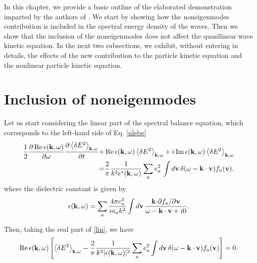 \documentclass[12pt,a4paper,ruledheader]{report}
\begin{document}
In this chapter, we provide a basic outline of the elaborated demonstration
imparted by the authors of \cite{YZKS16}. We start by showing how the
noneigenmodes contribution is included in the spectral energy density of the
waves. Then we show that the inclusion of the noneigenmodes does not affect
the quasilinear wave kinetic equation. In the next two subsections, we
exhibit, without entering in details, the effects of the new contribution
to the particle kinetic equation and the nonlinear particle kinetic equation.



\section{Inclusion of noneigenmodes}
\label{sec:inc-non}
Let us start considering the linear part of the spectral balance equation,
which corresponds to the left-hand side of Eq. \eqref{nlebe}
\begin{equation}
  \label{lin}
  \begin{split}
  \frac{1}{2}\frac{\partial \,\mbox{Re}\,\epsilon({\bf k},\omega)}{\partial \omega}
  \frac{\partial \left< \delta E^2 \right>_{{\bf k},\omega}}{\partial t}
  +&\,\mbox{Re}\,\epsilon({\bf k},\omega)
  \left< \delta E^2 \right>_{{\bf k},\omega}
  +i\, \mbox{Im}\,\epsilon({\bf k},\omega)
  \left< \delta E^2 \right>_{{\bf k},\omega}\\
  =&\frac{2}{\pi}\frac{1}{k^2\epsilon^{*}({\bf k},\omega)}
  \sum_a e^2_a\, \int d{\bf v}\,\delta(\omega-{\bf k \cdot v})f_a({\bf v}),
\end{split}
\end{equation}
where the dielectric constant is given by
\begin{equation}
  \label{dielec}
  \epsilon({\bf k},\omega)=\sum_a \frac{4\pi e^2_a}{m_ak^2}\int d{\bf v}\,
  \frac{{\bf k \cdot}\partial f_a/\partial{\bf v}}{\omega-{\bf k \cdot v}+i0}.
\end{equation}

Then, taking the real part of \eqref{lin}, we have
\begin{equation}
  \label{real}
  \mbox{Re}\, \epsilon({\bf k},\omega)\left[
  \left\langle \delta E^2 \right\rangle_{{\bf k},\omega}
  -\frac{2}{\pi}\frac{1}{k^2|\epsilon({\bf k},\omega)|^2}
  \sum_a e_a^2 \int d{\bf v}\, \delta(\omega-{\bf k \cdot v})
  f_a({\bf v})\right]=0.
\end{equation}
\end{document}
